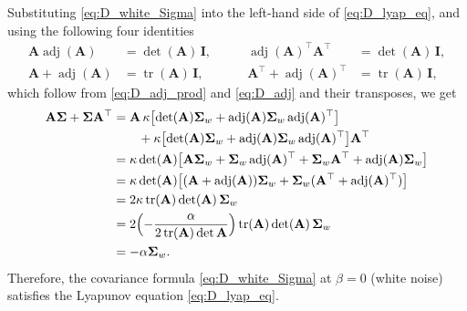 \documentclass[12pt]{article}
\newcommand{\tr}{\operatorname{tr}}
\newcommand{\adj}{\operatorname{adj}}
\begin{document}
Substituting \eqref{eq:D_white_Sigma} into the left-hand side of \eqref{eq:D_lyap_eq}, and using the following four identities
\begin{equation}
\begin{aligned}
    \mathbf{A}\adj(\mathbf{A})&=\det(\mathbf{A})\,\mathbf{I}, &\qquad \adj(\mathbf{A})^\top\mathbf{A}^\top&=\det(\mathbf{A})\,\mathbf{I},\\
    \mathbf{A}+\adj(\mathbf{A})&=\tr(\mathbf{A})\,\mathbf{I}, &\qquad \mathbf{A}^\top+\adj(\mathbf{A})^\top&=\tr(\mathbf{A})\,\mathbf{I},
\end{aligned}
    \label{eq:D_lyap_eq}
\end{equation}
which follow from \eqref{eq:D_adj_prod} and \eqref{eq:D_adj} and their transposes, we get
\begin{equation}
\begin{aligned}
    \mathbf{A}\boldsymbol\Sigma+\boldsymbol\Sigma\mathbf{A}^\top
    &=\mathbf{A}\,\kappa\bigl[\det(\mathbf{A})\boldsymbol\Sigma_w
      +\adj(\mathbf{A})\boldsymbol\Sigma_w\adj(\mathbf{A})^\top\bigr]\\
    &\qquad{}+\kappa\bigl[\det(\mathbf{A})\boldsymbol\Sigma_w
      +\adj(\mathbf{A})\boldsymbol\Sigma_w\adj(\mathbf{A})^\top\bigr]\mathbf{A}^\top\\
    &=\kappa\det(\mathbf A)\bigl[\mathbf A\boldsymbol\Sigma_w+\boldsymbol\Sigma_w\adj(\mathbf A)^\top
      +\boldsymbol\Sigma_w\mathbf A^\top+\adj(\mathbf A)\boldsymbol\Sigma_w\bigr]\\
    &=\kappa\det(\mathbf A)\bigl[(\mathbf A+\adj(\mathbf A))\boldsymbol\Sigma_w
      +\boldsymbol\Sigma_w(\mathbf A^\top+\adj(\mathbf A)^\top)\bigr]\\
    &=2\kappa\tr(\mathbf A)\det(\mathbf A)\,\boldsymbol\Sigma_w\\
    &=2\Bigl(-\frac{\alpha}{2\tr(\mathbf A)\det\mathbf A}\Bigr)
      \tr(\mathbf A)\det(\mathbf A)\,\boldsymbol\Sigma_w\\
    &=-\alpha\boldsymbol\Sigma_w.
\end{aligned}
    \label{eq:D_lyap_id}
\end{equation}
Therefore, the covariance formula \eqref{eq:D_white_Sigma} at $\beta=0$ (white noise) satisfies the Lyapunov equation
\eqref{eq:D_lyap_eq}.
\end{document}
